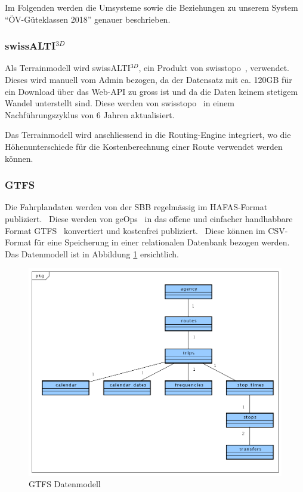Im Folgenden werden die Umsysteme sowie die Beziehungen zu unserem System "`ÖV-Güteklassen 2018"' genauer beschrieben.

\subsubsection{swissALTI$^{3D}$}
\label{subsystem:swissALTI3D}

Als \gls{Terrainmodell} wird swissALTI$^{3D}$, ein Produkt von swisstopo~\cite{swissalti3d_swisstopo}, verwendet.
Dieses wird manuell vom Admin bezogen, da der Datensatz mit ca. 120GB für ein Download über das Web-\ac{API} zu gross ist und da die Daten keinem stetigem Wandel unterstellt sind.
Diese werden von swisstopo~\cite{swissalti3d_swisstopo} in einem Nachführungszyklus von 6 Jahren aktualisiert.

Das \gls{Terrainmodell} wird anschliessend in die Routing-Engine integriert, wo die Höhenunterschiede für die Kostenberechnung einer Route verwendet werden können.

\subsubsection{GTFS}
\label{subsystem:GTFS}

Die Fahrplandaten werden von der SBB regelmässig im HAFAS-Format publiziert.~\cite{sbb_hafas_spec}
Diese werden von geOps~\cite{geops_fahrplandaten} in das offene und einfacher handhabbare Format \ac{GTFS}~\cite{gtfs_spec} konvertiert und kostenfrei publiziert.~\cite{geops_fahrplandaten}
Diese können im CSV-Format für eine Speicherung in einer relationalen Datenbank bezogen werden.
Das Datenmodell ist in Abbildung \ref{fig:GTFS_data_model} ersichtlich.

\begin{figure}[ht]
    \centering
    \includegraphics[width=1.0\linewidth]{projectdoc/img/GTFS_data_model}
    \caption[GTFS Datenmodell]{GTFS Datenmodell}
    \label{fig:GTFS_data_model}
\end{figure}

